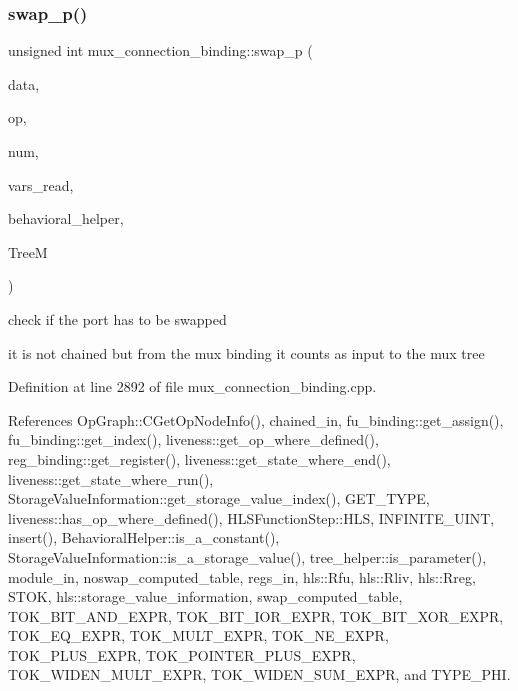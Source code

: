 \subsubsection{\texorpdfstring{swap\+\_\+p()}{swap\_p()}}
{\footnotesize\ttfamily unsigned int mux\+\_\+connection\+\_\+binding\+::swap\+\_\+p (\begin{DoxyParamCaption}\item[{const \hyperlink{op__graph_8hpp_a9a0b240622c47584bee6951a6f5de746}{Op\+Graph\+Const\+Ref}}]{data,  }\item[{\hyperlink{graph_8hpp_abefdcf0544e601805af44eca032cca14}{vertex}}]{op,  }\item[{unsigned int}]{num,  }\item[{std\+::vector$<$ \hyperlink{classHLS__manager_a972627cc658afa992590b9d2bf1a1e87}{H\+L\+S\+\_\+manager\+::io\+\_\+binding\+\_\+type} $>$ \&}]{vars\+\_\+read,  }\item[{const \hyperlink{behavioral__helper_8hpp_aae973b54cac87eef3b27442aa3e1e425}{Behavioral\+Helper\+Const\+Ref}}]{behavioral\+\_\+helper,  }\item[{const \hyperlink{tree__manager_8hpp_a96ff150c071ce11a9a7a1e40590f205e}{tree\+\_\+manager\+Ref}}]{TreeM }\end{DoxyParamCaption})}



check if the port has to be swapped 

it is not chained but from the mux binding it counts as input to the mux tree 

Definition at line 2892 of file mux\+\_\+connection\+\_\+binding.\+cpp.



References Op\+Graph\+::\+C\+Get\+Op\+Node\+Info(), chained\+\_\+in, fu\+\_\+binding\+::get\+\_\+assign(), fu\+\_\+binding\+::get\+\_\+index(), liveness\+::get\+\_\+op\+\_\+where\+\_\+defined(), reg\+\_\+binding\+::get\+\_\+register(), liveness\+::get\+\_\+state\+\_\+where\+\_\+end(), liveness\+::get\+\_\+state\+\_\+where\+\_\+run(), Storage\+Value\+Information\+::get\+\_\+storage\+\_\+value\+\_\+index(), G\+E\+T\+\_\+\+T\+Y\+PE, liveness\+::has\+\_\+op\+\_\+where\+\_\+defined(), H\+L\+S\+Function\+Step\+::\+H\+LS, I\+N\+F\+I\+N\+I\+T\+E\+\_\+\+U\+I\+NT, insert(), Behavioral\+Helper\+::is\+\_\+a\+\_\+constant(), Storage\+Value\+Information\+::is\+\_\+a\+\_\+storage\+\_\+value(), tree\+\_\+helper\+::is\+\_\+parameter(), module\+\_\+in, noswap\+\_\+computed\+\_\+table, regs\+\_\+in, hls\+::\+Rfu, hls\+::\+Rliv, hls\+::\+Rreg, S\+T\+OK, hls\+::storage\+\_\+value\+\_\+information, swap\+\_\+computed\+\_\+table, T\+O\+K\+\_\+\+B\+I\+T\+\_\+\+A\+N\+D\+\_\+\+E\+X\+PR, T\+O\+K\+\_\+\+B\+I\+T\+\_\+\+I\+O\+R\+\_\+\+E\+X\+PR, T\+O\+K\+\_\+\+B\+I\+T\+\_\+\+X\+O\+R\+\_\+\+E\+X\+PR, T\+O\+K\+\_\+\+E\+Q\+\_\+\+E\+X\+PR, T\+O\+K\+\_\+\+M\+U\+L\+T\+\_\+\+E\+X\+PR, T\+O\+K\+\_\+\+N\+E\+\_\+\+E\+X\+PR, T\+O\+K\+\_\+\+P\+L\+U\+S\+\_\+\+E\+X\+PR, T\+O\+K\+\_\+\+P\+O\+I\+N\+T\+E\+R\+\_\+\+P\+L\+U\+S\+\_\+\+E\+X\+PR, T\+O\+K\+\_\+\+W\+I\+D\+E\+N\+\_\+\+M\+U\+L\+T\+\_\+\+E\+X\+PR, T\+O\+K\+\_\+\+W\+I\+D\+E\+N\+\_\+\+S\+U\+M\+\_\+\+E\+X\+PR, and T\+Y\+P\+E\+\_\+\+P\+HI.

